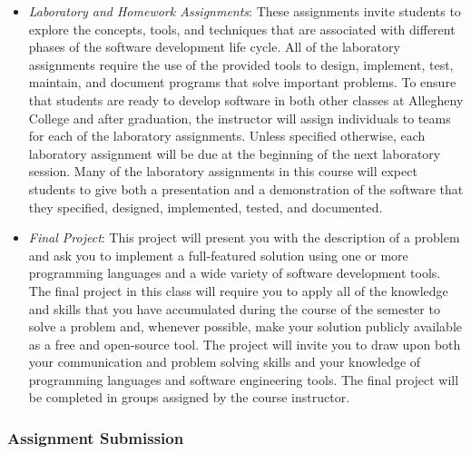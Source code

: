 \begin{itemize}
    \item {\em Laboratory and Homework Assignments}: These assignments invite students to explore the concepts, tools,
      and techniques that are associated with different phases of the software development life cycle.  All of the
      laboratory assignments require the use of the provided tools to design, implement, test, maintain, and document
      programs that solve important problems.  To ensure that students are ready to develop software in both other
      classes at Allegheny College and after graduation, the instructor will assign individuals to teams for each of the
      laboratory assignments.  Unless specified otherwise, each laboratory assignment will be due at the beginning of
      the next laboratory session.  Many of the laboratory assignments in this course will expect students to give both
      a presentation and a demonstration of the software that they specified, designed, implemented, tested, and
      documented.


    \item {\em Final Project}: This project will present you with the description of a problem and ask you to implement
      a full-featured solution using one or more programming languages and a wide variety of software development tools.
      The final project in this class will require you to apply all of the knowledge and skills that you have
      accumulated during the course of the semester to solve a problem and, whenever possible, make your solution
      publicly available as a free and open-source tool.  The project will invite you to draw upon both your
      communication and problem solving skills and your knowledge of programming languages and software engineering
      tools. The final project will be completed in groups assigned by the course instructor.

\end{itemize}

\subsubsection*{Assignment Submission}

